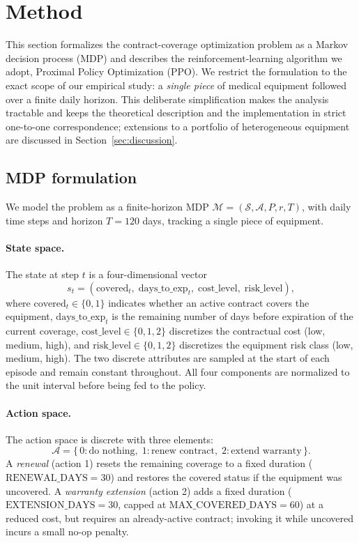 \section{Method}
\label{sec:methodology}

This section formalizes the contract-coverage optimization problem as a Markov decision process (MDP) and describes the reinforcement-learning algorithm we adopt, Proximal Policy Optimization (PPO). We restrict the formulation to the exact scope of our empirical study: a \emph{single piece} of medical equipment followed over a finite daily horizon. This deliberate simplification makes the analysis tractable and keeps the theoretical description and the implementation in strict one-to-one correspondence; extensions to a portfolio of heterogeneous equipment are discussed in Section~\ref{sec:discussion}.


\subsection{MDP formulation}
\label{subsec:mdp}

We model the problem as a finite-horizon MDP $\mathcal{M} = (\mathcal{S}, \mathcal{A}, P, r, T)$, with daily time steps and horizon $T = 120$ days, tracking a single piece of equipment.


\paragraph{State space.}
The state at step $t$ is a four-dimensional vector
\[
    s_t = (\mathrm{covered}_t,\;
           \mathrm{days\_to\_exp}_t,\;
           \mathrm{cost\_level},\;
           \mathrm{risk\_level}),
\]
where $\mathrm{covered}_t \in \{0, 1\}$ indicates whether an active contract covers the equipment, $\mathrm{days\_to\_exp}_t$ is the remaining number of days before expiration of the current coverage, $\mathrm{cost\_level} \in \{0, 1, 2\}$ discretizes the contractual cost (low, medium, high), and $\mathrm{risk\_level} \in \{0, 1, 2\}$ discretizes the equipment risk class (low, medium, high). The two discrete attributes are sampled at the start of each episode and remain constant throughout. All four components are normalized to the unit interval before being fed to the policy.


\paragraph{Action space.}
The action space is discrete with three elements:
\[
    \mathcal{A} = \{\, 0: \text{do nothing},\;
                      1: \text{renew contract},\;
                      2: \text{extend warranty} \,\}.
\]
A \emph{renewal} (action 1) resets the remaining coverage to a fixed duration ($\mathrm{RENEWAL\_DAYS} = 30$) and restores the covered status if the equipment was uncovered. A \emph{warranty extension} (action 2) adds a fixed duration ($\mathrm{EXTENSION\_DAYS} = 30$, capped at $\mathrm{MAX\_COVERED\_DAYS} = 60$) at a reduced cost, but requires an already-active contract; invoking it while uncovered incurs a small no-op penalty.


